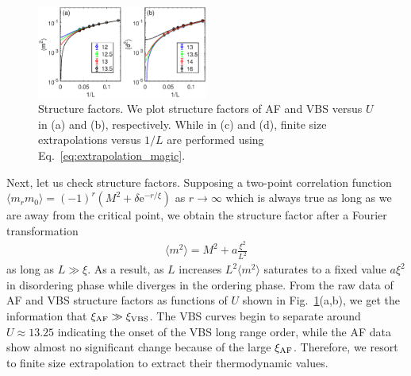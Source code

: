\documentclass[twocolumn,superscriptaddress]{revtex4-1}
\begin{document}


\begin{figure}
  \includegraphics[width=0.5\textwidth]{extrapolation}
  \caption{\label{fig:structurefactor}Structure factors. We plot structure factors of AF and VBS versus $U$ in (a) and (b), respectively. While in (c) and (d), finite size extrapolations versus $1/L$ are performed using Eq.~\ref{eq:extrapolation_magic}.}
\end{figure}
Next, let us check structure factors. Supposing a two-point correlation function $\langle m_rm_0 \rangle=(-1)^r(M^2 + \delta\mathrm{e}^{-r/\xi})$ as $r\rightarrow\infty$ which is always true as long as we are away from the critical point, we obtain the structure factor after a Fourier transformation 
\begin{eqnarray}\label{eq:extrapolation}
  \langle m^2 \rangle=M^2+a\frac{\xi^2}{L^2}
\end{eqnarray}
as long as $L\gg\xi$. As a result, as $L$ increases $L^2\langle m^2 \rangle$ saturates to a fixed value $a\xi^2$ in disordering phase while diverges in the ordering phase. From the raw data of AF and VBS structure factors as functions of $U$ shown in Fig.~\ref{fig:structurefactor}(a,b), we get the information that $\xi_{\rm AF}\gg\xi_{\rm VBS}$. The VBS curves begin to separate around $U\approx13.25$ indicating the onset of the VBS long range order, while the AF data show almost no significant change because of the large $\xi_{\rm AF}$. Therefore, we resort to finite size extrapolation to extract their thermodynamic values. 
\end{document}
